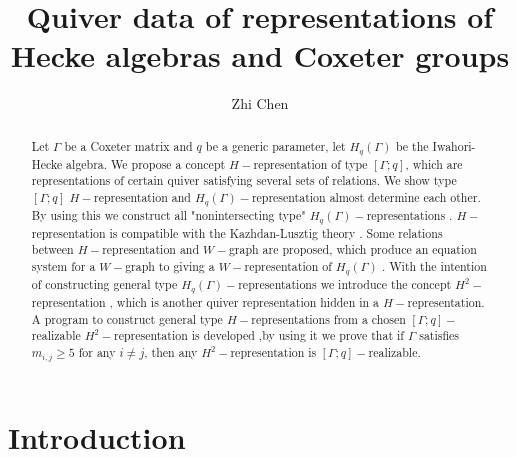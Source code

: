 \def\CTEXPreproc{Created by ctex v0.2.12, don't edit!}\documentclass[11pt]{article}
\begin{document}
\title{Quiver data of representations of Hecke algebras and Coxeter groups }
\author{Zhi Chen}
\date{}
\maketitle

\begin{abstract}

  Let $\Gamma$ be a Coxeter matrix and $q$ be a generic parameter, let $H_q (\Gamma)$ be the Iwahori-Hecke algebra.  We propose a  concept $H-$representation of type $[\Gamma;q]$, which are representations of certain quiver satisfying several sets of relations. We show type $[\Gamma;q]$ $H-$representation   and  $H_q (\Gamma)-$representation almost determine each other. By using this we construct all "nonintersecting type" $H_q (\Gamma)-$representations . $H-$representation is compatible with the Kazhdan-Lusztig theory . Some relations between $H-$representation and $W-$graph are proposed, which produce an equation system for a $W-$graph to giving a $W-$representation of $H_q (\Gamma)$ . With the intention of constructing general type $H_q (\Gamma)-$representations we introduce the concept $H^2 -$representation , which is another quiver representation hidden in a $H-$representation. A program to construct general type $H-$representations from a chosen $[\Gamma;q]-$realizable $H^2 -$representation is developed ,by using it we prove that if $\Gamma$ satisfies  $m_{i,j}\geq 5 $ for any $i\neq j$, then any $H^2 -$representation is $[\Gamma;q]-$realizable.



\end{abstract}


\section*{Introduction}
\end{document}
